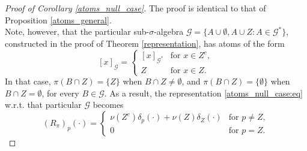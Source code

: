 \documentclass[a4paper]{article}
\theoremstyle{plain}
\theoremstyle{remark}
\theoremstyle{definition}
\begin{document}
\begin{proof}[Proof of Corollary \ref{atoms_null_case}]
The proof is identical to that of Proposition \ref{atoms_general}.\\

Note, however, that the particular sub-$\sigma$-algebra $\mathcal{G}=\{A\cup\emptyset, A\cup Z:A\in\mathcal{G}^*\}$, constructed in the proof of Theorem \ref{representation}, has atoms of the form
\[[x]_\mathcal{G}=\begin{cases} [x]_{\mathcal{G}^*} &\mbox{for }x\in Z^c,\\ Z & \mbox{for }x\in Z.
\end{cases}\]
In that case, $\pi(B\cap Z)=\{Z\}$ when $B\cap Z\neq\emptyset$, and $\pi(B\cap Z)=\{\emptyset\}$ when $B\cap Z=\emptyset$, for every $B\in\mathcal{G}$. As a result, the representation \eqref{atoms_null_case:eq} w.r.t. that particular $\mathcal{G}$ becomes
\[(R_\pi)_p(\cdot)=\begin{cases}\nu(Z^c)\delta_p(\cdot)+\nu(Z)\delta_Z(\cdot)&\mbox{for }p\neq Z,\\ 0&\mbox{for }p=Z.\end{cases}\]
\end{proof}
\end{document}
